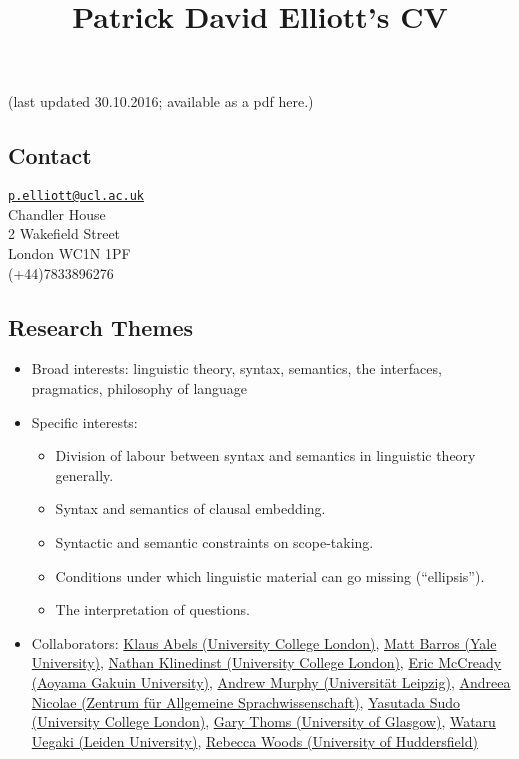 \documentclass[]{article}
\title{Patrick David Elliott's CV}
\date{}
\providecommand{\tightlist}{%
  \setlength{\itemsep}{0pt}\setlength{\parskip}{0pt}}
\begin{document}
\maketitle

(last updated 30.10.2016; available as a pdf here.)

\subsection{Contact}\label{contact}

\href{mailto:p.elliott@ucl.ac.uk}{\nolinkurl{p.elliott@ucl.ac.uk}}\\
Chandler House\\
2 Wakefield Street\\
London WC1N 1PF\\
(+44)7833896276

\subsection{Research Themes}\label{research-themes}

\begin{itemize}
\item
  Broad interests: linguistic theory, syntax, semantics, the interfaces,
  pragmatics, philosophy of language
\item
  Specific interests:

  \begin{itemize}
  \tightlist
  \item
    Division of labour between syntax and semantics in linguistic theory
    generally.
  \item
    Syntax and semantics of clausal embedding.
  \item
    Syntactic and semantic constraints on scope-taking.
  \item
    Conditions under which linguistic material can go missing
    (``ellipsis'').
  \item
    The interpretation of questions.
  \end{itemize}
\item
  Collaborators:
  \href{https://www.ucl.ac.uk/pals/people/profiles/academic-staff/klaus-abels}{Klaus
  Abels (University College London)},
  \href{http://ling.yale.edu/people/matt-barros}{Matt Barros (Yale
  University)},
  \href{https://www.ucl.ac.uk/pals/people/profiles/academic-stbineraff/nathan-klinedinst}{Nathan
  Klinedinst (University College London)},
  \href{https://sites.google.com/site/esmccready/}{Eric McCready (Aoyama
  Gakuin University)}, \href{home.uni-leipzig.de/murphy/}{Andrew Murphy
  (Universität Leipzig)},
  \href{https://sites.google.com/site/andreeanicolae/}{Andreea Nicolae
  (Zentrum für Allgemeine Sprachwissenschaft)},
  \href{www.ucl.ac.uk/~ucjtudo/}{Yasutada Sudo (University College
  London)}, \href{https://sites.google.com/site/garythoms/}{Gary Thoms
  (University of Glasgow)},
  \href{https://sites.google.com/site/esmccready/}{Wataru Uegaki (Leiden
  University)},
  \href{https://www.hud.ac.uk/ourstaff/profile/index.php?staffid=1451}{Rebecca
  Woods (University of Huddersfield)} 
\end{itemize}
\end{document}
